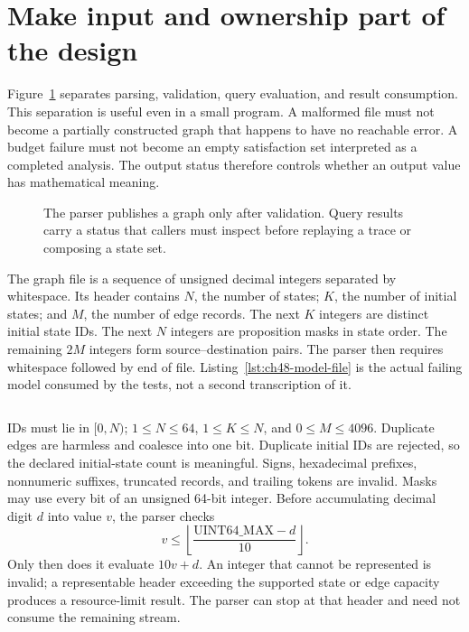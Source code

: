 \section{Make input and ownership part of the design}
\label{sec:ch48-interface}

Figure~\ref{fig:ch48-pipeline} separates parsing, validation, query evaluation, and result consumption.
This separation is useful even in a small program.
A malformed file must not become a partially constructed graph that happens to have no reachable error.
A budget failure must not become an empty satisfaction set interpreted as a completed analysis.
The output status therefore controls whether an output value has mathematical meaning.

\begin{figure}[htbp]
  \centering
  
  \caption{The parser publishes a graph only after validation. Query results carry a status that callers must inspect before replaying a trace or composing a state set.}
  \label{fig:ch48-pipeline}
\end{figure}

The graph file is a sequence of unsigned decimal integers separated by whitespace.
Its header contains $N$, the number of states; $K$, the number of initial states; and $M$, the number of edge records.
The next $K$ integers are distinct initial state IDs.
The next $N$ integers are proposition masks in state order.
The remaining $2M$ integers form source--destination pairs.
The parser then requires whitespace followed by end of file.
Listing~\ref{lst:ch48-model-file} is the actual failing model consumed by the tests, not a second transcription of it.

\begin{listing}[htbp]
  \inputminted{text}{example-code/model-checker/stale.graph}
  \caption{The failing model has six states, one initial state, and seven explicit edges.}
  \label{lst:ch48-model-file}
\end{listing}

IDs must lie in $[0,N)$; $1\leq N\leq64$, $1\leq K\leq N$, and $0\leq M\leq4096$.
Duplicate edges are harmless and coalesce into one bit.
Duplicate initial IDs are rejected, so the declared initial-state count is meaningful.
Signs, hexadecimal prefixes, nonnumeric suffixes, truncated records, and trailing tokens are invalid.
Masks may use every bit of an unsigned 64-bit integer.
Before accumulating decimal digit $d$ into value $v$, the parser checks
\[
  v \leq \left\lfloor\frac{\mathrm{UINT64\_MAX}-d}{10}\right\rfloor.
\]
Only then does it evaluate $10v+d$.
An integer that cannot be represented is invalid; a representable header exceeding the supported state or edge capacity produces a resource-limit result.
The parser can stop at that header and need not consume the remaining stream.

